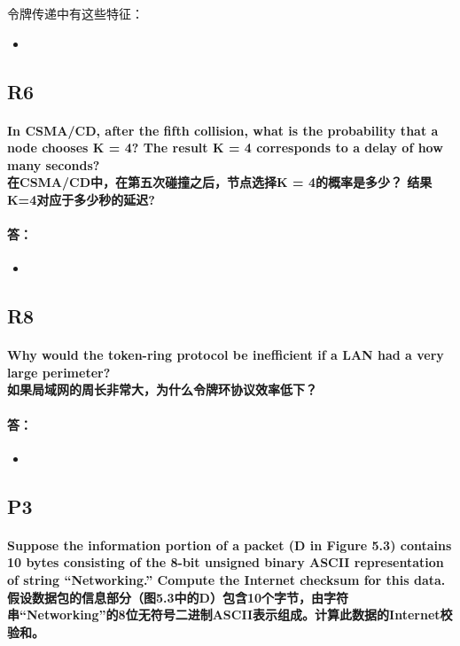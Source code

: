 \documentclass[a4paper]{ctexart}
\begin{document}
令牌传递中有这些特征：\\
\begin{itemize}
    \item 
\end{itemize}
\subsection*{R6}
\paragraph*{In CSMA/CD, after the fifth collision, what is the probability that a node chooses K = 4? The result K = 4 corresponds to a delay of how many seconds?\\
在CSMA/CD中，在第五次碰撞之后，节点选择K = 4的概率是多少？ 结果K=4对应于多少秒的延迟?}
\paragraph*{答：} 
\begin{itemize}
    \item 
\end{itemize}

\subsection*{R8}
\paragraph*{Why would the token-ring protocol be inefficient if a LAN had a very large perimeter?\\
如果局域网的周长非常大，为什么令牌环协议效率低下？}
\paragraph*{答：} 
\begin{itemize}
    \item 
\end{itemize}

\subsection*{P3}
\paragraph*{Suppose the information portion of a packet (D in Figure 5.3) contains 10 bytes consisting of the 8-bit unsigned binary ASCII representation of string “Networking.” Compute the Internet checksum for this data. \\
假设数据包的信息部分（图5.3中的D）包含10个字节，由字符串“Networking”的8位无符号二进制ASCII表示组成。计算此数据的Internet校验和。}
\end{document}
